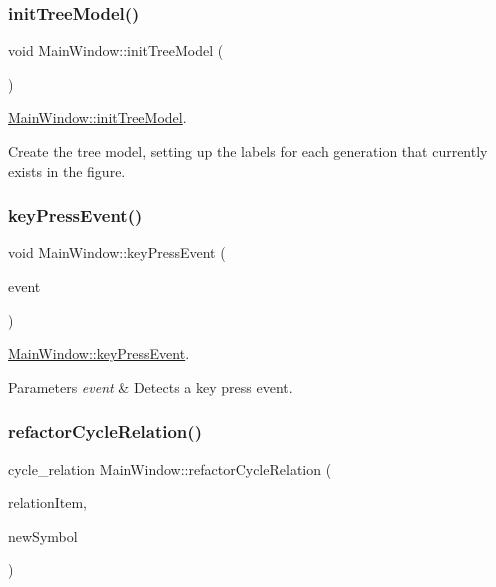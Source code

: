 \subsubsection{\texorpdfstring{init\+Tree\+Model()}{initTreeModel()}}
{\footnotesize\ttfamily void Main\+Window\+::init\+Tree\+Model (\begin{DoxyParamCaption}{ }\end{DoxyParamCaption})}



\mbox{\hyperlink{class_main_window_a3e45090789e16c49079857ab0617b239}{Main\+Window\+::init\+Tree\+Model}}. 

Create the tree model, setting up the labels for each generation that currently exists in the figure. \mbox{\label{class_main_window_a9c4f542263838b9ecd06eae839a42a34}} 
\subsubsection{\texorpdfstring{key\+Press\+Event()}{keyPressEvent()}}
{\footnotesize\ttfamily void Main\+Window\+::key\+Press\+Event (\begin{DoxyParamCaption}\item[{Q\+Key\+Event $\ast$}]{event }\end{DoxyParamCaption})}



\mbox{\hyperlink{class_main_window_a9c4f542263838b9ecd06eae839a42a34}{Main\+Window\+::key\+Press\+Event}}. 


\begin{DoxyParams}{Parameters}
{\em event} & Detects a key press event. \\
\hline
\end{DoxyParams}
\mbox{\label{class_main_window_a9fe708c683a2dd952ccb72e04cf4a62d}} 
\subsubsection{\texorpdfstring{refactor\+Cycle\+Relation()}{refactorCycleRelation()}}
{\footnotesize\ttfamily cycle\+\_\+relation Main\+Window\+::refactor\+Cycle\+Relation (\begin{DoxyParamCaption}\item[{const Gi\+Na\+C\+::ex \&}]{relation\+Item,  }\item[{const Gi\+Na\+C\+::ex \&}]{new\+Symbol }\end{DoxyParamCaption})}



